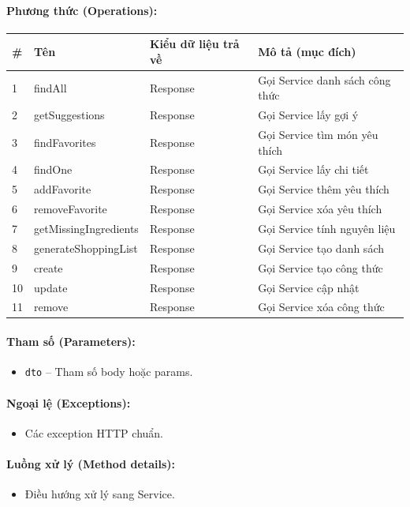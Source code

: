 \documentclass[12pt,a4paper]{article}
\begin{document}
\paragraph{Phương thức (Operations):}
\begin{longtable}{|p{0.6cm}|p{5.0cm}|p{2.8cm}|p{5.4cm}|}
\hline
\textbf{\#} & \textbf{Tên} & \textbf{Kiểu dữ liệu trả về} & \textbf{Mô tả (mục đích)} \\ \hline
\endhead
1 & findAll & Response & Gọi Service danh sách công thức \\ \hline
2 & getSuggestions & Response & Gọi Service lấy gợi ý \\ \hline
3 & findFavorites & Response & Gọi Service tìm món yêu thích \\ \hline
4 & findOne & Response & Gọi Service lấy chi tiết \\ \hline
5 & addFavorite & Response & Gọi Service thêm yêu thích \\ \hline
6 & removeFavorite & Response & Gọi Service xóa yêu thích \\ \hline
7 & getMissingIngredients & Response & Gọi Service tính nguyên liệu \\ \hline
8 & generateShoppingList & Response & Gọi Service tạo danh sách \\ \hline
9 & create & Response & Gọi Service tạo công thức \\ \hline
10 & update & Response & Gọi Service cập nhật \\ \hline
11 & remove & Response & Gọi Service xóa công thức \\ \hline
\end{longtable}

\paragraph{Tham số (Parameters):}
\begin{itemize}[leftmargin=*]
    \item \texttt{dto} – Tham số body hoặc params.
\end{itemize}


\paragraph{Ngoại lệ (Exceptions):}
\begin{itemize}[leftmargin=*]
    \item Các exception HTTP chuẩn.
\end{itemize}


\paragraph{Luồng xử lý (Method details):}
\begin{itemize}[leftmargin=*]
    \item Điều hướng xử lý sang Service.
\end{itemize}
\end{document}
